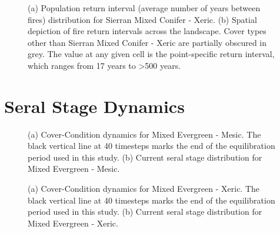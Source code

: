 \begin{figure}[!htbp]
  \centering
  \caption{(a) Population return interval (average number of years between fires) distribution for Sierran Mixed Conifer - Xeric.  (b) Spatial depiction of fire return intervals across the landscape. Cover types other than Sierran Mixed Conifer - Xeric are partially obscured in grey. The value at any given cell is the point-specific return interval, which ranges from 17 years to \textgreater 500 years.}
\label{fig:preturn_smcx_app}
\end{figure}

\clearpage

\section{Seral Stage Dynamics}
\label{app:sec:seraldynamics}

\begin{figure}[!htbp]
  \centering
  \caption{(a) Cover-Condition dynamics for Mixed Evergreen - Mesic. The black vertical line at 40 timesteps marks the end of the equilibration period used in this study. (b) Current seral stage distribution for Mixed Evergreen - Mesic.}
\label{fig:covcond_megm}
\end{figure}

\begin{figure}[!htbp]
  \centering
  \caption{(a) Cover-Condition dynamics for Mixed Evergreen - Xeric. The black vertical line at 40 timesteps marks the end of the equilibration period used in this study. (b) Current seral stage distribution for Mixed Evergreen - Xeric.} 
  \label{fig:covcond_megx}
\end{figure}

